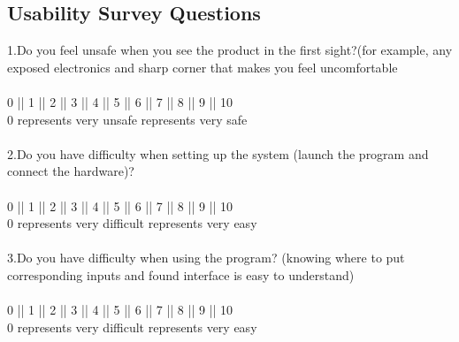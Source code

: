 \documentclass[12pt, titlepage]{article}
\begin{document}
\subsection{Usability Survey Questions}

1.Do you feel unsafe when you see the product in the first sight?(for example, any exposed electronics and sharp corner that makes you feel uncomfortable\\
\bigskip\\
0 || 1 || 2 || 3 || 4 || 5 || 6 || 7 || 8 || 9 || 10\\
0 represents very unsafe  represents very safe\\
\bigskip\\
2.Do you have difficulty when setting up the system (launch the program and connect the hardware)?\\
\bigskip\\
0 || 1 || 2 || 3 || 4 || 5 || 6 || 7 || 8 || 9 || 10\\
0 represents very difficult  represents very easy\\
\bigskip\\
3.Do you have difficulty when using the program? (knowing where to put corresponding inputs and found interface is easy to understand)\\
\bigskip\\
0 || 1 || 2 || 3 || 4 || 5 || 6 || 7 || 8 || 9 || 10\\
0 represents very difficult  represents very easy\\
\end{document}
